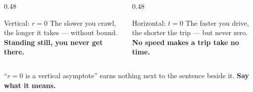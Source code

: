 \documentclass[aspectratio=169, 11pt]{beamer}
\begin{document}
\begin{frame}[t, plain]
  \begin{columns}[T]
    \begin{column}{0.48\textwidth}
      \begin{block}{Vertical: $r=0$}
        The slower you crawl, the longer it takes --- without bound. \\[4pt]
        \centering\textbf{Standing still, you never get there.}
      \end{block}
    \end{column}
    \begin{column}{0.48\textwidth}
      \begin{block}{Horizontal: $t=0$}
        The faster you drive, the shorter the trip --- but never zero. \\[4pt]
        \centering\textbf{No speed makes a trip take no time.}
      \end{block}
    \end{column}
  \end{columns}
  \vspace{8pt}
  \begin{block}{}
    \centering ``$r=0$ is a vertical asymptote'' earns nothing next to the sentence beside it.
    \textbf{Say what it means.}
  \end{block}
\end{frame}
\end{document}
